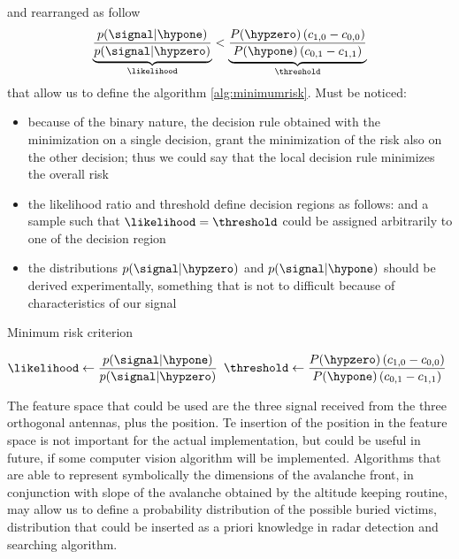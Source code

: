 and rearranged as follow
\begin{equation}
\naming{ \dfrac{p(\signal|\hypone)}{p(\signal|\hypzero)} }{\likelihood} < \naming{ \dfrac{P(\hypzero)\braces{c_{1,0} - c_{0,0}}}{P(\hypone)\braces{c_{0,1} - c_{1,1}}} }{\threshold}
\end{equation}
that allow us to define the algorithm \ref{alg:minimumrisk}. Must be noticed:
\begin{itemize}
\item because of the binary nature, the decision rule obtained with the minimization on a single decision, grant the minimization of the risk also on the other decision; thus we could say that the local decision rule minimizes the overall risk
\item the likelihood ratio and threshold define decision regions as follows:
\arraymath{
	\decspacezero &=& \{ \signal\in\decspace \,:\,\likelihood<\threshold \} \\
	\decspaceone &=& \{ \signal\in\decspace \,:\,\likelihood>\threshold \} 
}
and a sample such that $\likelihood=\threshold$ could be assigned arbitrarily to one of the decision region
\item the distributions ${p(\signal|\hypzero)}$ and ${p(\signal|\hypone)}$ should be derived experimentally, something that is not to difficult because of characteristics of our signal
\end{itemize}
\begin{algorithm}[h]
\caption{Minimum risk criterion}
\label{alg:minimumrisk}
$\likelihood \leftarrow \dfrac{p(\signal|\hypone)}{p(\signal|\hypzero)} $ \;
$\threshold \leftarrow \dfrac{P(\hypzero)\braces{c_{1,0} - c_{0,0}}}{P(\hypone)\braces{c_{0,1} - c_{1,1}}}$ \;
\end{algorithm}

The feature space that could be used are the three signal received from the three orthogonal antennas, plus the position. Te insertion of the position in the feature space is not important for the actual implementation, but could be useful in future, if some computer vision algorithm will be implemented. Algorithms that are able to represent symbolically the dimensions of the avalanche front, in conjunction with slope of the avalanche obtained by the altitude keeping routine, may allow us to define a probability distribution of the possible buried victims, distribution that could be inserted as a priori knowledge in radar detection and searching algorithm.
\FloatBarrier